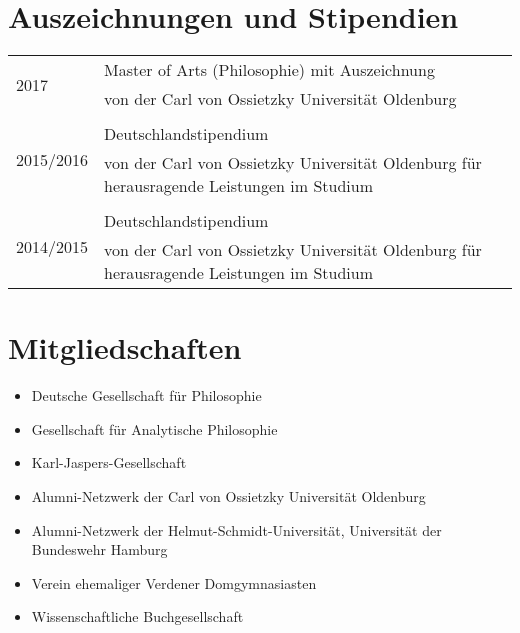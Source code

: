 \documentclass[a4paper,10pt]{article}
\begin{document}
\section{Auszeichnungen und Stipendien}
\begin{longtable}{p{}p{}}
\multirow{2}{1,75cm}{\footnotesize{2017}} & Master of Arts (Philosophie) mit Auszeichnung\\
& \footnotesize{von der Carl von Ossietzky Universität Oldenburg}\\
\\
\multirow{2}{1,75cm}{\footnotesize{2015/2016}} & Deutschlandstipendium\\
& \footnotesize{von der Carl von Ossietzky Universität Oldenburg für herausragende Leistungen im Studium}\\
\\
\multirow{2}{1,75cm}{\footnotesize{2014/2015}} & Deutschlandstipendium\\
& \footnotesize{von der Carl von Ossietzky Universität Oldenburg für herausragende Leistungen im Studium}\\
\end{longtable}


\section{Mitgliedschaften}
\begin{itemize}
   \item Deutsche Gesellschaft für Philosophie
   \item Gesellschaft für Analytische Philosophie
   \item Karl-Jaspers-Gesellschaft
   \item Alumni-Netzwerk der Carl von Ossietzky Universität Oldenburg
   \item Alumni-Netzwerk der Helmut-Schmidt-Universität, Universität der Bundeswehr Hamburg
   \item Verein ehemaliger Verdener Domgymnasiasten
   \item Wissenschaftliche Buchgesellschaft
\end{itemize}


\end{document}

